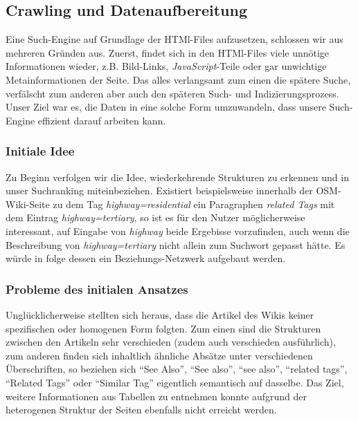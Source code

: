 \documentclass[12pt,pdftex,a4paper]{article}
\begin{document}
\subsection{Crawling und Datenaufbereitung}
Eine Such-Engine auf Grundlage der HTMl-Files aufzusetzen, schlossen wir aus mehreren Gründen aus. Zuerst, findet sich in den HTMl-Files viele unnötige Informationen wieder, z.B. Bild-Links, \textit{JavaScript}-Teile oder gar unwichtige Metainformationen der Seite. Das alles verlangsamt zum einen die spätere Suche, verfälscht zum anderen aber auch den späteren Such- und Indizierungsprozess.\\
Unser Ziel war es, die Daten in eine solche Form umzuwandeln, dass unsere Such-Engine effizient darauf arbeiten kann.

\subsubsection{Initiale Idee}
Zu Beginn verfolgen wir die Idee, wiederkehrende Strukturen zu erkennen und in unser Suchranking miteinbeziehen. Existiert beispielsweise innerhalb der OSM-Wiki-Seite zu dem Tag \textit{highway=residential} ein Paragraphen \textit{related Tags} mit dem Eintrag \textit{highway=tertiary}, so ist es für den Nutzer möglicherweise interessant, auf Eingabe von \textit{highway} beide Ergebisse vorzufinden, auch wenn die Beschreibung von \textit{highway=tertiary} nicht allein zum Suchwort gepasst hätte. Es würde in folge dessen ein Beziehungs-Netzwerk aufgebaut werden.

\subsubsection{Probleme des initialen Ansatzes}
Unglücklicherweise stellten sich heraus, dass die Artikel des Wikis keiner spezifischen oder homogenen Form folgten. Zum einen sind die Strukturen zwischen den Artikeln sehr verschieden (zudem auch verschieden ausführlich), zum anderen finden sich inhaltlich ähnliche Absätze unter verschiedenen Überschriften, so beziehen sich ``See Also'', ``See also'', ``see also'', ``related tags'', ``Related Tags'' oder ``Similar Tag'' eigentlich semantisch auf dasselbe.
Das Ziel, weitere Informationen aus Tabellen zu entnehmen konnte aufgrund der heterogenen Struktur der Seiten ebenfalls nicht erreicht werden.
\end{document}
